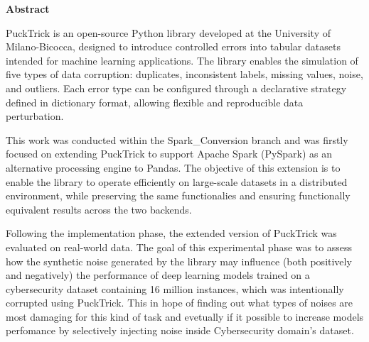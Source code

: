 \documentclass[../main.tex]{subfiles}
\begin{document}
\newpage

\begin{center}
\textbf{\LARGE Abstract}
\end{center}

PuckTrick is an open-source Python library developed at the University of Milano-Bicocca, designed to introduce controlled errors into tabular datasets intended for machine learning applications. The library enables the simulation of five types of data corruption: duplicates, inconsistent labels, missing values, noise, and outliers. Each error type can be configured through a declarative strategy defined in dictionary format, allowing flexible and reproducible data perturbation.

This work was conducted within the Spark\_Conversion branch and was firstly focused on extending PuckTrick to support Apache Spark (PySpark) as an alternative processing engine to Pandas. The objective of this extension is to enable the library to operate efficiently on large-scale datasets in a distributed environment, while preserving the same functionalies and ensuring functionally equivalent results across the two backends.

Following the implementation phase, the extended version of PuckTrick was evaluated on real-world data. The goal of this experimental phase was to assess how the synthetic noise generated by the library may influence (both positively and negatively) the performance of deep learning models trained on a cybersecurity dataset containing 16 million instances, which was intentionally corrupted using PuckTrick. This in hope of finding out what types of noises are most damaging for this kind of task and evetually if it possible to increase models perfomance by selectively injecting noise inside Cybersecurity domain's dataset.
\end{document}
